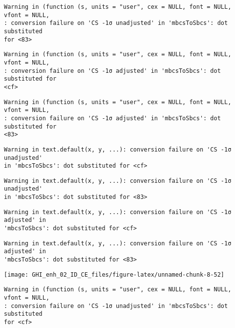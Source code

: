 \documentclass[
  10pt,
  a4paper,oneside]{article}
\begin{document}
\begin{verbatim}
Warning in (function (s, units = "user", cex = NULL, font = NULL, vfont = NULL,
: conversion failure on 'CS -1σ unadjusted' in 'mbcsToSbcs': dot substituted
for <83>
\end{verbatim}

\begin{verbatim}
Warning in (function (s, units = "user", cex = NULL, font = NULL, vfont = NULL,
: conversion failure on 'CS -1σ adjusted' in 'mbcsToSbcs': dot substituted for
<cf>
\end{verbatim}

\begin{verbatim}
Warning in (function (s, units = "user", cex = NULL, font = NULL, vfont = NULL,
: conversion failure on 'CS -1σ adjusted' in 'mbcsToSbcs': dot substituted for
<83>
\end{verbatim}

\begin{verbatim}
Warning in text.default(x, y, ...): conversion failure on 'CS -1σ unadjusted'
in 'mbcsToSbcs': dot substituted for <cf>
\end{verbatim}

\begin{verbatim}
Warning in text.default(x, y, ...): conversion failure on 'CS -1σ unadjusted'
in 'mbcsToSbcs': dot substituted for <83>
\end{verbatim}

\begin{verbatim}
Warning in text.default(x, y, ...): conversion failure on 'CS -1σ adjusted' in
'mbcsToSbcs': dot substituted for <cf>
\end{verbatim}

\begin{verbatim}
Warning in text.default(x, y, ...): conversion failure on 'CS -1σ adjusted' in
'mbcsToSbcs': dot substituted for <83>
\end{verbatim}

\begin{center}\texttt{[image: GHI\_enh\_02\_ID\_CE\_files/figure-latex/unnamed-chunk-8-52]} \end{center}

\begin{verbatim}
Warning in (function (s, units = "user", cex = NULL, font = NULL, vfont = NULL,
: conversion failure on 'CS -1σ unadjusted' in 'mbcsToSbcs': dot substituted
for <cf>
\end{verbatim}
\end{document}
